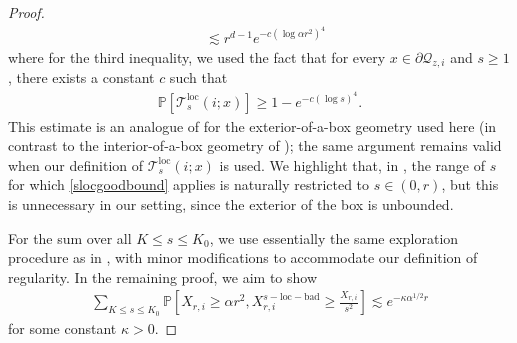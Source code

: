 \documentclass[11pt]{article}
\theoremstyle{definition}
\theoremstyle{remark}
\newcommand{\bP}{\mathbb{P}}
\numberwithin{equation}{section}
\theoremstyle{plain}
\theoremstyle{definition}
\theoremstyle{remark}
\theoremstyle{plain}
\begin{document}
\begin{proof}
\begin{align*}
    &\lesssim r^{d-1}e^{-c(\log \alpha r^2)^4}
  \end{align*}
  where for the third inequality, we used the fact that for every $x \in \partial \mathcal Q_{z,i}$ and $s\geq 1$, there exists a constant $c$ such that
  \begin{align}\label{slocgoodbound}
    \bP[\mathcal T_{s}^{\mathrm{loc}}(i;x)]\ge 1-e^{-c(\log s)^4}.
  \end{align}
This estimate is an analogue of \cite[Claim~5.5]{ASS} for the exterior-of-a-box geometry used here (in contrast to the interior-of-a-box geometry of \cite{ASS}); the same argument remains valid when our definition of $\mathcal T_{s}^{\mathrm{loc}}(i;x)$ is used. We highlight that, in \cite{ASS}, the range of $s$ for which \eqref{slocgoodbound} applies is naturally restricted to $s\in (0,r)$, but this is unnecessary in our setting, since the exterior of the box is unbounded.

For the sum over all $K\le s\le K_0$, we use essentially the same exploration procedure as in \cite{ASS, KN11}, with minor modifications to accommodate our definition of regularity. In the remaining proof, we aim to show
\begin{align}\label{smalls}
     \sum_{K\le s\le K_0}\bP[X_{r,i}\ge \alpha r^2,X_{r,i}^{s-\mathrm{loc-bad}}\ge \frac{X_{r,i}}{s^2}]\lesssim e^{-\kappa\alpha^{1/2}r}
  \end{align}
  for some constant $\kappa>0$.


\end{proof}
\end{document}
